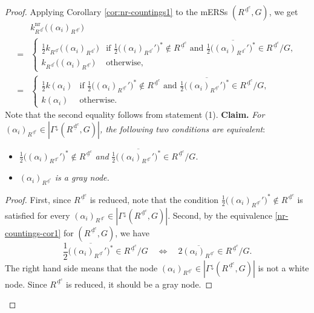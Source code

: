 \documentclass[11pt]{amsart}
\newcommand{\nr}{\mathrm{nr}}
\newcommand{\dc}{\,\underline{\mathrm{d}}^c}
\begin{document}
{\begin{proof}
Applying Corollary \ref{cor:nr-countings1} to the mERSs $(R^{\dc},G)$, we get 
\begin{align*}
& k_{R^{\dc}}^\nr \big((\alpha_i)_{R^{\dc}}\big) \\
=
&\begin{cases}
\frac12 k_{R^{\dc}}\big((\alpha_i)_{R^{\dc}}\big)
& \text{if $\frac12\big((\alpha_i)_{R^{\dc}}'\big)^\ast\not\in R^{\dc}$ and 
$\frac12 \overline{\big((\alpha_i)_{R^{\dc}}'\big)^\ast}\in R^{\dc}/G$},\\
k_{R^{\dc}}\big((\alpha_i)_{R^{\dc}}\big)
& \text{otherwise},
\end{cases}\\
=
&\begin{cases}
\frac12 k(\alpha_i)
& \text{if $\frac12\big((\alpha_i)_{R^{\dc}}'\big)^\ast\not\in R^{\dc}$ and 
$\frac12 \overline{\big((\alpha_i)_{R^{\dc}}'\big)^\ast}\in R^{\dc}/G$},\\
k(\alpha_i)
& \text{otherwise}.
\end{cases}
\end{align*}
Note that the second equality follows from statement (1). 
\vskip 3mm
\noindent
{\bf Claim.} {\it For $(\alpha_i)_{R^{\dc}}\in |\Gamma^{\downarrow}(R^{\dc},G)|$,
the following two conditions are equivalent}:
\begin{itemize}
\item[(a)] $\frac12\big((\alpha_i)_{R^{\dc}}'\big)^\ast\not\in R^{\dc}$ {\it and} 
$\frac12 \overline{\big((\alpha_i)_{R^{\dc}}'\big)^\ast}\in R^{\dc}/G$.
\vskip 1mm
\item[(b)] {\it $(\alpha_i)_{R^{\dc}}$ is a gray node.}
\end{itemize}
\begin{proof}
First, since $R^{\dc}$ is reduced, note that the condition 
$\frac12\big((\alpha_i)_{R^{\dc}}'\big)^\ast\not\in R^{\dc}$
is satisfied for every $(\alpha_i)_{R^{\dc}}\in |\Gamma^{\downarrow}(R^{\dc},G)|$.
Second, by 
the equivalence \eqref{nr-countings-cor1} for
$(R^{\dc},G)$, we have
\[\frac12 \overline{\big((\alpha_i)_{R^{\dc}}'\big)^\ast}\in R^{\dc}/G\quad 
\Longleftrightarrow\quad 2\overline{(\alpha_i)_{R^{\dc}}}
\in R^{\dc}/G.\]
The right hand side means that the node 
$(\alpha_i)_{R^{\dc}}\in |\Gamma^{\downarrow}(R^{\dc},G)|$ is not 
a white node. Since $R^{\dc}$ is reduced, it should be a gray node. 
\end{proof}



\end{proof}}
\end{document}
